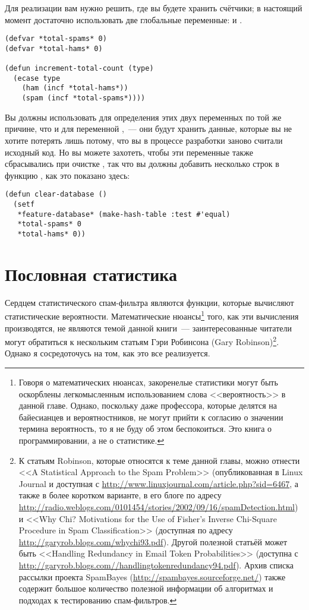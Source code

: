 Для реализации  вам нужно решить, где вы будете хранить
счётчики; в настоящий момент достаточно использовать две глобальные переменные:
 и .

\begin{lstlisting}
(defvar *total-spams* 0)
(defvar *total-hams* 0)

(defun increment-total-count (type)
  (ecase type
    (ham (incf *total-hams*))
    (spam (incf *total-spams*))))
\end{lstlisting}

Вы должны использовать  для определения этих двух переменных по той же
причине, что и для переменной ,~--- они будут хранить данные,
которые вы не хотите потерять лишь потому, что вы в процессе разработки заново считали
исходный код.  Но вы можете захотеть, чтобы эти переменные также сбрасывались при очистке
, так что вы должны добавить несколько строк в функцию
, как это показано здесь:

\begin{lstlisting}
(defun clear-database ()
  (setf
   *feature-database* (make-hash-table :test #'equal)
   *total-spams* 0
   *total-hams* 0))
\end{lstlisting}

\section{Пословная статистика}

Сердцем статистического спам-фильтра являются функции, которые вычисляют статистические
вероятности.  Математические нюансы\footnote{Говоря о математических нюансах, закоренелые
  статистики могут быть оскорблены легкомысленным использованием слова <<вероятность>> в
  данной главе.  Однако, поскольку даже профессора, которые делятся на
  байесианцев и вероятностников, не могут прийти к согласию о значении термина
  вероятность, то я не буду об этом беспокоиться.  Это книга о программировании, а не о
  статистике.} того, как эти вычисления производятся, не являются темой данной книги~---
заинтересованные читатели могут обратиться к нескольким статьям Гэри Робинсона (Gary Robinson)\footnote{К
  статьям Robinson, которые относятся к теме данной главы, можно отнести <<A Statistical
  Approach to the Spam Problem>> (опубликованная в Linux Journal и доступная с
  \url{http://www.linuxjournal.com/article.php?sid=6467}, а также в более коротком
  варианте, в его блоге по адресу
  \url{http://radio.weblogs.com/0101454/stories/2002/09/16/spamDetection.html}) и <<Why
  Chi?  Motivations for the Use of Fisher's Inverse Chi-Square Procedure in Spam
  Classification>> (доступная по адресу \url{http://garyrob.blogs.com/whychi93.pdf}).
  Другой полезной статьёй может быть <<Handling Redundancy in Email Token Probabilities>>
  (доступна с \url{http://garyrob.blogs.com//handlingtokenredundancy94.pdf}).  Архив
  списка рассылки проекта SpamBayes (\url{http://spambayes.sourceforge.net/}) также
  содержит большое количество полезной информации об алгоритмах и подходах к тестированию
  спам-фильтров.}. Однако я сосредоточусь на том, как это все реализуется.

